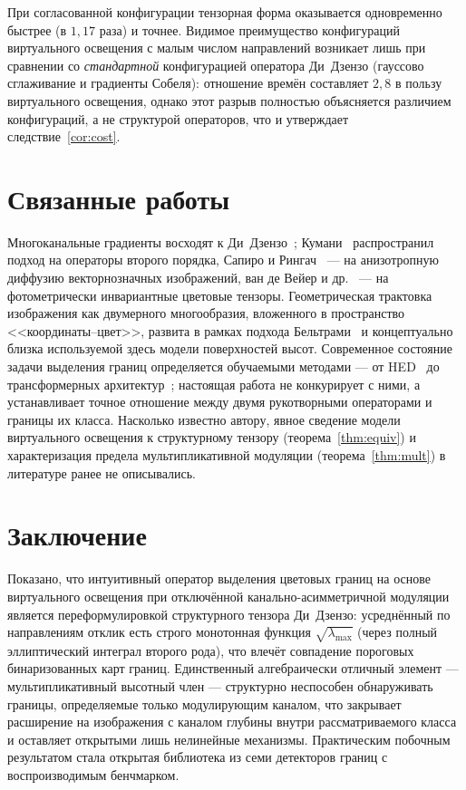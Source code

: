 \documentclass[11pt,a4paper]{article}
\theoremstyle{plain}
\theoremstyle{definition}
\theoremstyle{remark}
\newcommand{\lmax}{\lambda_{\max}}
\begin{document}
При согласованной конфигурации тензорная форма оказывается одновременно
быстрее (в $1{,}17$ раза) и точнее. Видимое преимущество конфигураций
виртуального освещения с малым числом направлений возникает лишь при
сравнении со \emph{стандартной} конфигурацией оператора Ди~Дзензо
(гауссово сглаживание и градиенты Собеля): отношение времён составляет
$2{,}8$ в пользу виртуального освещения, однако этот разрыв полностью
объясняется различием конфигураций, а не структурой операторов, что и
утверждает следствие~\ref{cor:cost}.

\section{Связанные работы}
\label{sec:related}

Многоканальные градиенты восходят к Ди~Дзензо~\cite{dizenzo1986};
Кумани~\cite{cumani1991} распространил подход на операторы второго порядка,
Сапиро и Рингач~\cite{sapiro1996} --- на анизотропную диффузию
векторнозначных изображений, ван де Вейер и др.~\cite{weijer2006} ---
на фотометрически инвариантные цветовые тензоры. Геометрическая трактовка
изображения как двумерного многообразия, вложенного в пространство
<<координаты--цвет>>, развита в рамках подхода Бельтрами~\cite{sochen1998}
и концептуально близка используемой здесь модели поверхностей высот.
Современное состояние задачи выделения границ определяется обучаемыми
методами --- от HED~\cite{xie2015} до трансформерных
архитектур~\cite{pu2022edter}; настоящая работа не конкурирует с ними, а
устанавливает точное отношение между двумя рукотворными операторами и
границы их класса. Насколько известно автору, явное сведение модели
виртуального освещения к структурному тензору (теорема~\ref{thm:equiv}) и
характеризация предела мультипликативной модуляции
(теорема~\ref{thm:mult}) в литературе ранее не описывались.

\section{Заключение}
\label{sec:conclusion}

Показано, что интуитивный оператор выделения цветовых границ на основе
виртуального освещения при отключённой канально-асимметричной модуляции
является переформулировкой структурного тензора Ди~Дзензо: усреднённый по
направлениям отклик есть строго монотонная функция $\sqrt{\lmax}$
(через полный эллиптический интеграл второго рода), что влечёт совпадение
пороговых бинаризованных карт границ. Единственный алгебраически отличный
элемент --- мультипликативный высотный член --- структурно неспособен
обнаруживать границы, определяемые только модулирующим каналом, что
закрывает расширение на изображения с каналом глубины внутри
рассматриваемого класса и оставляет открытыми лишь нелинейные механизмы. Практическим побочным результатом
стала открытая библиотека из семи детекторов границ с воспроизводимым
бенчмарком.
\end{document}
